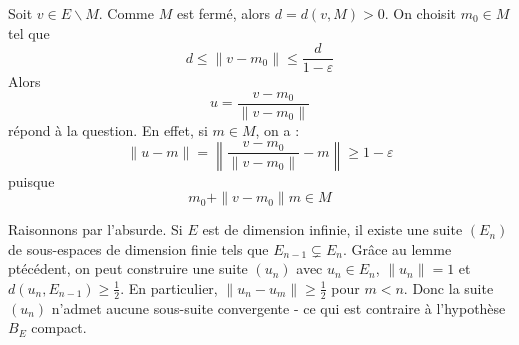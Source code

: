 \begin{dem}
Soit $v\in E\backslash M$. Comme $M$ est fermé, alors $d=d(v,M)>0$. On choisit $m_0\in M$ tel que \[d\leq \|v-m_0\|\leq \frac{d}{1-\varepsilon}\]
Alors \[u=\frac{v-m_0}{\|v-m_0\|}\]
répond à la question. En effet, si $m\in M$, on a : \[\|u-m\|=\left\|\frac{v-m_0}{\|v-m_0\|} -m\right\|\geq 1-\varepsilon\]
puisque \[m_0+\|v-m_0\|m\in M\]
\end{dem}


\begin{dem}
Raisonnons par l'absurde. Si $E$ est de dimension infinie, il existe une suite $(E_n)$ de sous-espaces de dimension finie tels que $E_{n-1}\subsetneq E_n$. Grâce au lemme ptécédent, on peut construire une suite $(u_n)$ avec $u_n\in E_n$, $\|u_n\|=1$ et $d(u_n,E_{n-1})\geq \frac{1}{2}$. En particulier, $\|u_n-u_m\|\geq\frac{1}{2}$ pour $m<n$. Donc la suite $(u_n)$ n'admet aucune sous-suite convergente - ce qui est contraire à l'hypothèse $B_E$ compact.
\end{dem}


